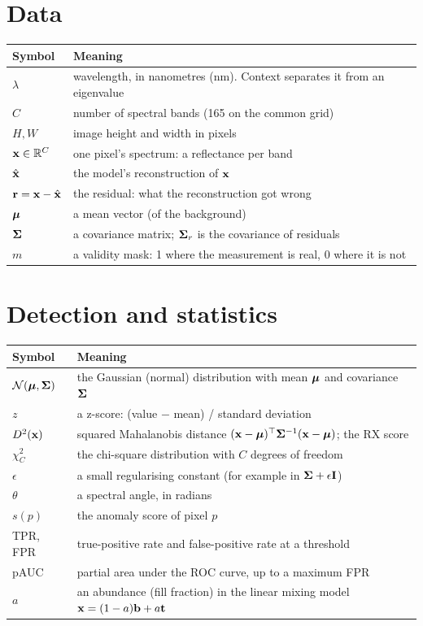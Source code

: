 \section*{Data}
\begin{longtable}{@{}p{30mm}p{110mm}@{}}
\toprule
Symbol & Meaning \\
\midrule\endhead
$\lambda$ & wavelength, in nanometres (nm). Context separates it from an eigenvalue \\
$C$ & number of spectral bands (165 on the common grid) \\
$H, W$ & image height and width in pixels \\
$\mathbf{x} \in \mathbb{R}^{C}$ & one pixel's spectrum: a reflectance per band \\
$\hat{\mathbf{x}}$ & the model's reconstruction of $\mathbf{x}$ \\
$\mathbf{r} = \mathbf{x} - \hat{\mathbf{x}}$ & the residual: what the reconstruction got wrong \\
$\boldsymbol{\mu}$ & a mean vector (of the background) \\
$\boldsymbol{\Sigma}$ & a covariance matrix; $\boldsymbol{\Sigma}_r$ is the covariance of residuals \\
$m$ & a validity mask: 1 where the measurement is real, 0 where it is not \\
\bottomrule
\end{longtable}

\section*{Detection and statistics}
\begin{longtable}{@{}p{30mm}p{110mm}@{}}
\toprule
Symbol & Meaning \\
\midrule\endhead
$\mathcal{N}(\boldsymbol{\mu}, \boldsymbol{\Sigma})$ & the Gaussian (normal) distribution with mean $\boldsymbol{\mu}$ and covariance $\boldsymbol{\Sigma}$ \\
$z$ & a z-score: (value $-$ mean) / standard deviation \\
$D^2(\mathbf{x})$ & squared Mahalanobis distance $(\mathbf{x}-\boldsymbol{\mu})^{\top}\boldsymbol{\Sigma}^{-1}(\mathbf{x}-\boldsymbol{\mu})$; the RX score \\
$\chi^2_C$ & the chi-square distribution with $C$ degrees of freedom \\
$\epsilon$ & a small regularising constant (for example in $\boldsymbol{\Sigma} + \epsilon\mathbf{I}$) \\
$\theta$ & a spectral angle, in radians \\
$s(p)$ & the anomaly score of pixel $p$ \\
TPR, FPR & true-positive rate and false-positive rate at a threshold \\
pAUC & partial area under the ROC curve, up to a maximum FPR \\
$a$ & an abundance (fill fraction) in the linear mixing model $\mathbf{x} = (1-a)\mathbf{b} + a\mathbf{t}$ \\
\bottomrule
\end{longtable}

